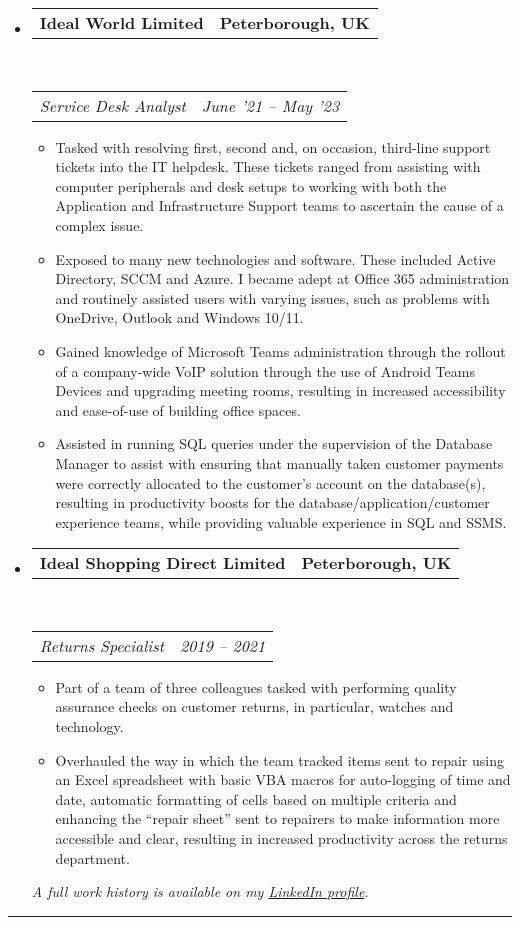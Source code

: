 \documentclass[10pt,a4paper]{article}
\makeatletter
\newcommand{\headerrow}[2]
{\begin{tabular*}{\linewidth}{l@{\extracolsep{\fill}}r}
	#1 &
	#2 \\
\end{tabular*}}
\makeatother
\begin{document}
\begin{itemize}
	\item
	\headerrow
		{\textbf{Ideal World Limited}}
		{\textbf{Peterborough, UK}}
	\\
	\headerrow
		{\emph{Service Desk Analyst}}
		{\emph{June '21 -- May '23}}
	\begin{itemize}
		\item Tasked with resolving first, second and, on occasion, third-line support tickets into the IT helpdesk. These tickets ranged from assisting with computer peripherals and desk setups to working with both the Application and Infrastructure Support teams to ascertain the cause of a complex issue.
		\item Exposed to many new technologies and software. These included Active Directory, SCCM and Azure. I became adept at Office 365 administration and routinely assisted users with varying issues, such as problems with OneDrive, Outlook and Windows 10/11.
		\item Gained knowledge of Microsoft Teams administration through the rollout of a company-wide VoIP solution through the use of Android Teams Devices and upgrading meeting rooms, resulting in increased accessibility and ease-of-use of building office spaces.
		\item Assisted in running SQL queries under the supervision of the Database Manager to assist with ensuring that manually taken customer payments were correctly allocated to the customer's account on the database(s), resulting in productivity boosts for the database/application/customer experience teams, while providing valuable experience in SQL and SSMS.
	\end{itemize}
\pagebreak
	\item
	\headerrow
		{\textbf{Ideal Shopping Direct Limited}}
		{\textbf{Peterborough, UK}}
	\\
	\headerrow
		{\emph{Returns Specialist}}
		{\emph{2019 -- 2021}}
	\begin{itemize}
		\item Part of a team of three colleagues tasked with performing quality assurance checks on customer returns, in particular, watches and technology. 
		\item Overhauled the way in which the team tracked items sent to repair using an Excel spreadsheet with basic VBA macros for auto-logging of time and date, automatic formatting of cells based on multiple criteria and enhancing the ``repair sheet'' sent to repairers to make information more accessible and clear, resulting in increased productivity across the returns department.
	\end{itemize}

	\begin{center}
		\color{gray}\small\emph{A full work history is available on my \href{https://linkedin.com/in/artydh}{LinkedIn profile}.}
	\end{center}
\end{itemize}
\vspace{-0.5em}
\hrule
\vspace{1.75em}
\end{document}
